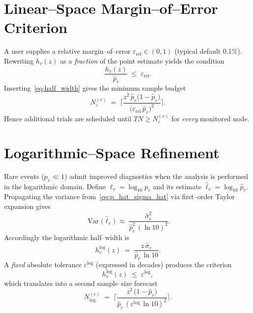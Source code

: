 \section{Linear--Space Margin--of--Error Criterion}
\label{subsec:lin_margin}

A user supplies a relative margin--of--error $\varepsilon_{\mathrm{rel}}\!\in\!(0,1)$
(typical default 0.1\%).  Rewriting $h_v(z)$ as a \emph{fraction} of the point
estimate yields the condition
\begin{equation}
  \frac{h_v(z)}{\widehat{p}_v} \;\le\; \varepsilon_{\mathrm{rel}}.
  \label{eq:lin_conv}
\end{equation}
Inserting~\eqref{eq:half_width} gives the minimum sample budget
\begin{equation}
  N_{\varepsilon}^{(v)}
  \;=\;
  \biggl\lceil
    \frac{z^{2}\,\widehat{p}_v\bigl(1-\widehat{p}_v\bigr)}
         {\bigl(\varepsilon_{\mathrm{rel}}\,\widehat{p}_v\bigr)^{2}}
  \biggr\rceil.
  \label{eq:trials_required_lin}
\end{equation}
Hence additional trials are scheduled until $T N\ge N_{\varepsilon}^{(v)}$ for
\emph{every} monitored node.

\section{Logarithmic--Space Refinement}
\label{subsec:log_margin}

Rare events ($p_v\ll 1$) admit improved diagnostics when the analysis is
performed in the logarithmic domain.  Define $\ell_v = \log_{10} p_v$ and its
estimate $\widehat{\ell}_v = \log_{10} \widehat{p}_v$.
Propagating the variance from~\eqref{eq:p_hat_sigma_hat} via first--order
Taylor expansion gives
\begin{equation}
  \operatorname{Var}\!\bigl(\widehat{\ell}_v\bigr)
  \;\approx\;
  \frac{\widehat{\sigma}_v^{2}}
       {\widehat{p}_v^{2}\,(\ln 10)^{2}}.
\end{equation}
Accordingly the logarithmic half--width is
\begin{equation}
  h^{\log}_{v}(z)
  \;=\;
  \frac{z\,\widehat{\sigma}_v}{\widehat{p}_v\,\ln 10}.
\end{equation}
A \emph{fixed} absolute tolerance $\varepsilon^{\log}$ (expressed in decades)
produces the criterion
\begin{equation}
  h^{\log}_{v}(z) \;\le\; \varepsilon^{\log},
  \label{eq:log_conv}
\end{equation}
which translates into a second sample--size forecast
\begin{equation}
  N^{(v)}_{\log}
  \;=\;
  \biggl\lceil
    \frac{z^{2}\,\bigl(1-\widehat{p}_v\bigr)}
         {\widehat{p}_v\,(\varepsilon^{\log}\,\ln 10)^{2}}
  \biggr\rceil.
  \label{eq:trials_required_log}
\end{equation}


